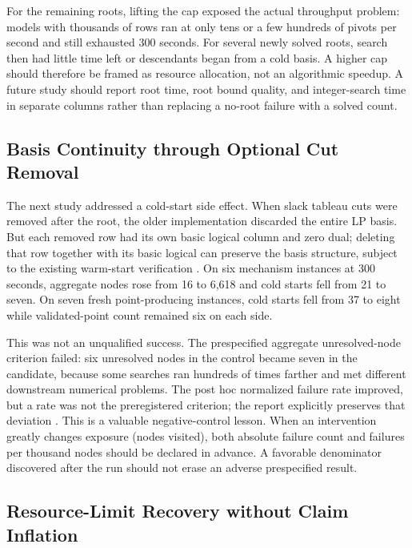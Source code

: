\documentclass[10pt,a4paper,twocolumn]{article}
\begin{document}
For the remaining roots, lifting the cap exposed the actual throughput problem: models with thousands of rows ran at only tens or a few hundreds of pivots per second and still exhausted 300 seconds. For several newly solved roots, search then had little time left or descendants began from a cold basis. A higher cap should therefore be framed as resource allocation, not an algorithmic speedup. A future study should report root time, root bound quality, and integer-search time in separate columns rather than replacing a no-root failure with a solved count.

\subsection{Basis Continuity through Optional Cut Removal}

The next study addressed a cold-start side effect. When slack tableau cuts were removed after the root, the older implementation discarded the entire LP basis. But each removed row had its own basic logical column and zero dual; deleting that row together with its basic logical can preserve the basis structure, subject to the existing warm-start verification \cite{iter35}. On six mechanism instances at 300 seconds, aggregate nodes rose from 16 to 6,618 and cold starts fell from 21 to seven. On seven fresh point-producing instances, cold starts fell from 37 to eight while validated-point count remained six on each side.

This was not an unqualified success. The prespecified aggregate unresolved-node criterion failed: six unresolved nodes in the control became seven in the candidate, because some searches ran hundreds of times farther and met different downstream numerical problems. The post hoc normalized failure rate improved, but a rate was not the preregistered criterion; the report explicitly preserves that deviation \cite{iter35}. This is a valuable negative-control lesson. When an intervention greatly changes exposure (nodes visited), both absolute failure count and failures per thousand nodes should be declared in advance. A favorable denominator discovered after the run should not erase an adverse prespecified result.

\subsection{Resource-Limit Recovery without Claim Inflation}
\end{document}
